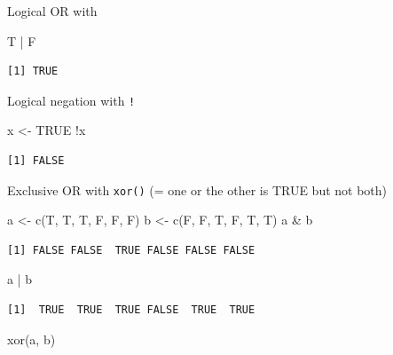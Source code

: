 \documentclass[
]{book}
\newenvironment{Shaded}{\begin{snugshade}}{\end{snugshade}}
\newcommand{\ConstantTok}[1]{\textcolor[rgb]{0.00,0.00,0.00}{#1}}
\newcommand{\FunctionTok}[1]{\textcolor[rgb]{0.00,0.00,0.00}{#1}}
\newcommand{\NormalTok}[1]{#1}
\newcommand{\OtherTok}[1]{\textcolor[rgb]{0.56,0.35,0.01}{#1}}
\newcommand{\SpecialCharTok}[1]{\textcolor[rgb]{0.00,0.00,0.00}{#1}}
\begin{document}
Logical OR with \texttt{\textbar{}}

\begin{Shaded}
\begin{Highlighting}[]
\NormalTok{T }\SpecialCharTok{|}\NormalTok{ F}
\end{Highlighting}
\end{Shaded}

\begin{verbatim}
[1] TRUE
\end{verbatim}

Logical negation with \texttt{!}

\begin{Shaded}
\begin{Highlighting}[]
\NormalTok{x }\OtherTok{\textless{}{-}} \ConstantTok{TRUE}
\SpecialCharTok{!}\NormalTok{x}
\end{Highlighting}
\end{Shaded}

\begin{verbatim}
[1] FALSE
\end{verbatim}

Exclusive OR with \texttt{xor()}
(= one or the other is TRUE but not both)

\begin{Shaded}
\begin{Highlighting}[]
\NormalTok{a }\OtherTok{\textless{}{-}} \FunctionTok{c}\NormalTok{(T, T, T, F, F, F)}
\NormalTok{b }\OtherTok{\textless{}{-}} \FunctionTok{c}\NormalTok{(F, F, T, F, T, T)}
\NormalTok{a }\SpecialCharTok{\&}\NormalTok{ b}
\end{Highlighting}
\end{Shaded}

\begin{verbatim}
[1] FALSE FALSE  TRUE FALSE FALSE FALSE
\end{verbatim}

\begin{Shaded}
\begin{Highlighting}[]
\NormalTok{a }\SpecialCharTok{|}\NormalTok{ b}
\end{Highlighting}
\end{Shaded}

\begin{verbatim}
[1]  TRUE  TRUE  TRUE FALSE  TRUE  TRUE
\end{verbatim}

\begin{Shaded}
\begin{Highlighting}[]
\FunctionTok{xor}\NormalTok{(a, b)}
\end{Highlighting}
\end{Shaded}
\end{document}
